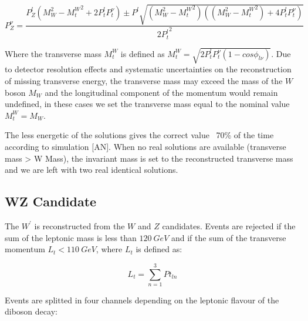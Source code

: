 \[
P_{Z}^{\nu} = \frac{P_{Z}^{l}({M_{W}^{2}-{M_{t}^{W}}^2+2P_{t}^{l}{P_{t}^{\nu}}}) \pm P^{l}\sqrt{(M_{W}^{2}-{M_{t}^{W}}^2)((M_{W}^{2}-{M_{t}^{W}}^2)+4P_{t}^{l}P_{t}^{\nu})}}{{2P_{t}^{l}}^{2}}
\]

Where the transverse mass $M_{t}^{W}$ is defined
as ${M_{t}^{W}}=\sqrt{2P_{t}^{l}P_{t}^{\nu}(1-cos\phi_{l\nu})}$.
Due to detector resolution effects and systematic uncertainties on the
reconstruction of missing transverse energy, the transverse mass may
exceed the mass of the $W$ boson $M_W$ and the
longitudinal component of the momentum would remain undefined, in these cases
we set the transverse mass equal to the nominal value $M_{t}^{W}=M_W$.

The less energetic of the solutions gives the correct value ~70\% of the time
according to simulation [AN].
When no real solutions are available (transverse mass > W Mass), the invariant
mass is set to the reconstructed transverse mass and we are left with two real
identical solutions.

\subsection{WZ Candidate}

The $W^{\prime}$ is reconstructed from the $W$ and $Z$ candidates.
Events are rejected if the sum of the leptonic mass is less than $120~GeV$ and
if the sum of the transverse momentum $L_{t}<110~GeV$, where $L_{t}$ is defined
as:

\[
L_{t} = \sum_{n=1}^{3} Pt_{ln}
\]

Events are splitted in four channels depending on the leptonic flavour of the
diboson decay:

